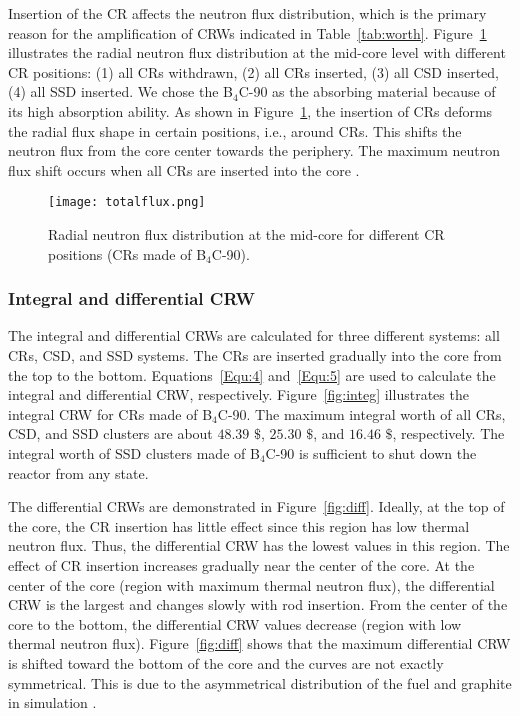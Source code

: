 Insertion of the CR affects the neutron flux distribution, which is 
the primary reason for the amplification of CRWs indicated in 
Table~\ref{tab:worth}. Figure~\ref{fig:totalflux} illustrates the radial 
neutron flux distribution at the mid-core level with different CR positions: 
(1) all CRs withdrawn, (2) all CRs inserted, (3) all CSD inserted, (4) all SSD 
inserted. We chose the B$_4$C-90 as the absorbing material because of its high 
absorption ability. As shown in Figure~\ref{fig:totalflux}, the insertion of 
CRs deforms the radial flux shape in certain positions, i.e., around CRs.
This shifts the neutron flux from the core center towards the 
periphery. The maximum neutron flux shift occurs when all CRs are inserted 
into the core \cite{girardin2007control}.
\begin{figure}[!ht]
	\centering
	\texttt{[image: totalflux.png]}
	\vspace{-0.5in}
	\caption{Radial neutron flux distribution at the mid-core for different 
	CR positions (CRs made of B$_4$C-90).} 
	\label{fig:totalflux}
\end{figure}
 

\subsubsection{Integral and differential CRW}

The integral and differential CRWs are calculated for three 
different systems: all CRs, CSD, and SSD systems. The CRs are 
inserted gradually into the core from the top to the bottom. 
Equations~\ref{Equ:4} and~\ref{Equ:5} are used to calculate the integral and 
differential CRW, respectively. Figure~\ref{fig:integ} illustrates the integral CRW for CRs 
made of B$_4$C-90. The maximum integral worth of all CRs, CSD, and SSD 
clusters are about $48.39$ $\$$, $25.30$ $\$$, and $16.46$ $\$$, respectively. The 
integral worth of SSD clusters made of B$_4$C-90 is sufficient to shut down the reactor from any 
state.

The differential CRWs are demonstrated in Figure~\ref{fig:diff}. Ideally, at the top of the core, the CR insertion has little effect since this region has low thermal neutron flux. Thus, the differential CRW has the lowest values in this region. The effect of CR insertion increases gradually near the center of the core. At the center of the core (region with maximum thermal neutron flux), the differential CRW is the largest and changes slowly with rod insertion. From the center of the core to the bottom, the differential CRW values decrease (region with low thermal neutron flux). Figure~\ref{fig:diff} shows that the maximum differential CRW is shifted toward the bottom of the core and the curves are not exactly symmetrical. This is due to the asymmetrical distribution of the fuel and graphite in simulation \cite{xuemei2013study,son2016control}.

